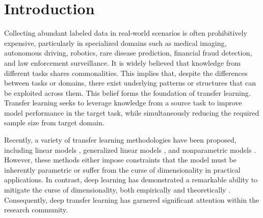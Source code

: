 \section{Introduction}\label{section: intro}
Collecting abundant labeled data in real-world scenarios is often prohibitively expensive, particularly in specialized domains such as medical imaging, autonomous driving, robotics, rare disease prediction, financial fraud detection, and law enforcement surveillance. It is widely believed that knowledge from different tasks shares commonalities. This implies that, despite the differences between tasks or domains, there exist underlying patterns or structures that can be exploited across them. This belief forms the foundation of transfer learning. Transfer learning seeks to leverage knowledge from a source task to improve model performance in the target task, while simultaneously reducing the required sample size from target domain.

Recently, a variety of transfer learning methodologies have been proposed, including linear models \citep{Li2021LinearTransfer, singh2023representationtransferlearningmultiple, zhao2024residualimportanceweightedtransfer, liu2024unifiedtransferlearningmodels}, generalized linear models \citep{tian2022transferlearninghighdimensionalgeneralized, Li2023GenerlizedLinearTransfer}, and nonparametric models \citep{shimodaira2000improving, ben2006analysis, blitzer2007learning, sugiyama2007direct, mansour2009domain, wang2016nonparametric, cai2019transferlearningnonparametricclassification, reeve2021adaptivetransferlearning, fan2023robusttransferlearningunreliable, maity2021linearadjustmentbasedapproach, lin2024hypothesistransferlearningfunctional, cai2024transferlearningnonparametricregression}. However, these methods either impose constraints that the model must be inherently parametric or suffer from the curse of dimensionality \citep{hollander2013nonparametric, wainwright2019high} in practical applications. In contrast, deep learning has demonstrated a remarkable ability to mitigate the curse of dimensionality, both empirically \citep{lecun2015deep, dive2021muli} and theoretically \citep{kohler2004adaptive, kohler2016nonparametric, bauer2019on, schmidt2020nonparametric}. Consequently, deep transfer learning has garnered significant attention within the research community.

